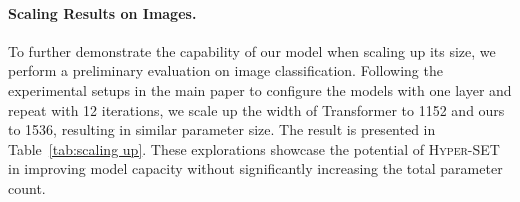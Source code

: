 \paragraph{Scaling Results on Images.} To further demonstrate the capability of our model when scaling up its size, we perform a preliminary evaluation on image classification. Following the experimental setups in the main paper to configure the models with one layer and repeat with 12 iterations, we scale up the width 
 of Transformer to 1152 and ours to 1536, resulting in similar parameter size. The result is presented in Table~\ref{tab:scaling up}. These explorations showcase the potential of \textsc{Hyper-SET} in improving model capacity without significantly increasing the total parameter count.

\begin{table}[htbp]
\caption{Top-1 accuracy for image classification when scaling up the model size. Our model surpasses other baselines while being parameter-efficient compared to vanilla Transformer.}
\label{tab:scaling up}
\centering
{}
\end{table}


